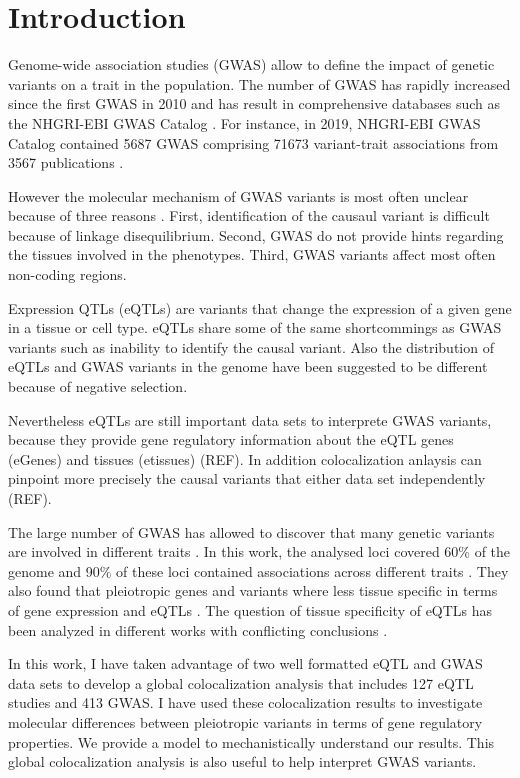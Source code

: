 \section*{Introduction}\label{sec:introduction}

Genome-wide association studies (GWAS) allow to define the impact of genetic variants on a trait in the population.
%
The number of GWAS has rapidly increased since the first GWAS in 2010 and has result in comprehensive databases such as the NHGRI-EBI GWAS Catalog \citep{2018.Parkinson.Buniello}.
%
For instance, in 2019, NHGRI-EBI GWAS Catalog contained 5687 GWAS comprising 71673 variant-trait associations from 3567 publications \citep{2018.Parkinson.Buniello}.

However the molecular mechanism of GWAS variants is most often unclear because of three reasons \citep{2020.Trynka.CanoGamez}.
%
First, identification of the causaul variant is difficult because of linkage disequilibrium.
%
Second, GWAS do not provide hints regarding the tissues involved in the phenotypes.
%
Third, GWAS variants affect most often non-coding regions.

Expression QTLs (eQTLs) are variants that change the expression of a given gene in a tissue or cell type.
%
eQTLs share some of the same shortcommings as GWAS variants such as inability to identify the causal variant.
%
Also the distribution of eQTLs and GWAS variants in the genome have been suggested to be different because of negative selection.

Nevertheless eQTLs are still important data sets to interprete GWAS variants, because they provide gene regulatory information about the eQTL genes (eGenes) and tissues (etissues) (REF).
%
In addition colocalization anlaysis can pinpoint more precisely the causal variants that either data set independently (REF).

The large number of GWAS has allowed to discover that many genetic variants are involved in different traits \citep{2019.Posthuma.Watanabe}.
%
In this work, the analysed loci covered 60\% of the genome and 90\% of these loci contained associations across different traits \citep{2019.Posthuma.Watanabe}.
%
They also found that pleiotropic genes and variants where less tissue specific in terms of gene expression and eQTLs \citep{2019.Posthuma.Watanabe}.
%
The question of tissue specificity of eQTLs has been analyzed in different works with conflicting conclusions \citep{2021.Li.Mu.GenomeBiology.impactcelltype,2018.Vijayanand.Schmiedel.Cell.ImpactGeneticPolymorphisms,2017...Nature}.

In this work, I have taken advantage of two well formatted eQTL and GWAS data sets to develop a global colocalization analysis that includes 127 eQTL studies and 413 GWAS.
%
I have used these colocalization results to investigate molecular differences between pleiotropic variants in terms of gene regulatory properties.
%
We provide a model to mechanistically understand our results.
%
This global colocalization analysis is also useful to help interpret GWAS variants.
